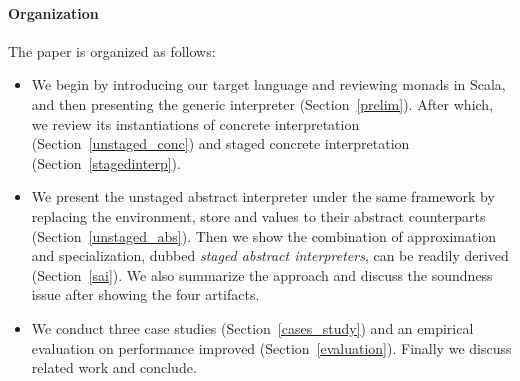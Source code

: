\paragraph{Organization} The paper is organized as follows:
\begin{itemize}[leftmargin=2em]
  \item We begin by introducing our target language and reviewing
    monads in Scala, and then presenting the generic interpreter
    (Section~\ref{prelim}).  After which, we review its instantiations
    of concrete interpretation (Section~\ref{unstaged_conc}) and
    staged concrete interpretation (Section~\ref{stagedinterp}).
  \item We present the unstaged abstract interpreter under the same
    framework by replacing the environment, store and values to their
    abstract counterparts (Section~\ref{unstaged_abs}). Then we
    show the combination of approximation and specialization, dubbed
    \textit{staged abstract interpreters}, can be readily derived
    (Section~\ref{sai}). We also summarize the approach and discuss
    the soundness issue after showing the four artifacts.
  \item We conduct three case studies (Section~\ref{cases_study}) and
    an empirical evaluation on performance improved (Section~\ref{evaluation}).
    Finally we discuss related work and conclude.
\end{itemize}

\iffalse
On the other side, static analysis is a trade-off between performance and
precision: higher precision usually leads to longer running time.

4. Existing method to improve the performance is adhoc, engineering heavy, require to rewrite the optimized version, therefore harder to reason about the correctness
6. program analyzers are also meta-programs, they manipulate other programs as data objects
\fi
